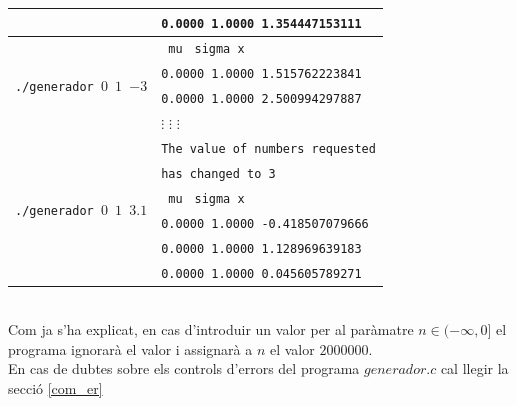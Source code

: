\documentclass[a4paper, 11pt]{article}
\begin{document}
\begin{itemize}
\begin{table}[h]
\begin{center}
\begin{tabular}{ l | l }
            & \texttt{0.0000 1.0000 1.354447153111}\\\hline
             \multirow{4}{*}{\texttt{./generador  $0$  $1$ $-3$}} & \hspace{1.5em}\texttt{    mu} \hspace{0.2em}\texttt{  sigma            }\hspace{5.9em}\texttt{x}\\ 
            & \texttt{0.0000 1.0000 1.515762223841}\\
            & \texttt{0.0000 1.0000 2.500994297887}\\
            & \hspace{2.5em}$\vdots$ \hspace{3em}$\vdots$ \hspace{5.5em}$\vdots$\\\hline
             \multirow{6}{*}{\texttt{./generador  $0$  $1$ $3.1$}} &\texttt{The value of numbers requested}\\
             & \texttt{has changed to 3} \\
             & \hspace{1.5em}\texttt{    mu} \hspace{0.2em}\texttt{  sigma            }\hspace{5.9em}\texttt{x}\\ 
            & \texttt{0.0000 1.0000 -0.418507079666}\\
            & \texttt{0.0000 1.0000 1.128969639183}\\
            & \texttt{0.0000 1.0000 0.045605789271}\\
            \end{tabular}
            \end{center}
    \end{table}\\
    Com ja s'ha explicat, en cas d'introduir un valor per al paràmatre $n\in(-\infty,0]$ el programa ignorarà el valor i assignarà a $n$ el valor $2000000$.\\
    En cas de dubtes sobre els controls d'errors del programa $generador.c$ cal llegir la secció \textcolor{blue}{\ref{com_er}}
    \end{itemize}
    \newpage
\end{document}
